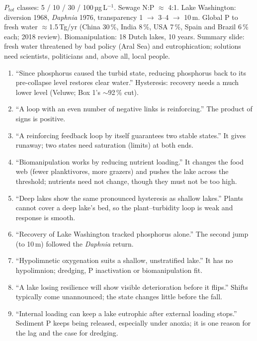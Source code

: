 \begin{numbers}
$P_{tot}$ classes: 5 / 10 / 30 / 100\,µg\,L$^{-1}$. Sewage N:P $\approx$ 4:1. Lake Washington: diversion 1968,
\emph{Daphnia} 1976, transparency 1 $\to$ 3--4 $\to$ 10\,m. Global P to fresh water $\approx$1.5\,Tg/yr (China 30\,\%,
India 8\,\%, USA 7\,\%, Spain and Brazil 6\,\% each; 2018 review). Biomanipulation: 18 Dutch lakes, 10 years.
Summary slide: fresh water threatened by bad policy (Aral Sea) and eutrophication; solutions need scientists,
politicians and, above all, local people.
\end{numbers}

\begin{statements}
\begin{enumerate}[label=\arabic*.]
\item ``Since phosphorus caused the turbid state, reducing phosphorus back to its pre-collapse level restores clear water.''
\F Hysteresis: recovery needs a much lower level (Veluwe; Box 1's $\sim$92\,\% cut).
\item ``A loop with an even number of negative links is reinforcing.''
\T The product of signs is positive.
\item ``A reinforcing feedback loop by itself guarantees two stable states.''
\F It gives runaway; two states need saturation (limits) at both ends.
\item ``Biomanipulation works by reducing nutrient loading.''
\F It changes the food web (fewer planktivores, more grazers) and pushes the lake across the threshold; nutrients
need not change, though they must not be too high.
\item ``Deep lakes show the same pronounced hysteresis as shallow lakes.''
\F Plants cannot cover a deep lake's bed, so the plant--turbidity loop is weak and response is smooth.
\item ``Recovery of Lake Washington tracked phosphorus alone.''
\F The second jump (to 10\,m) followed the \emph{Daphnia} return.
\item ``Hypolimnetic oxygenation suits a shallow, unstratified lake.''
\F It has no hypolimnion; dredging, P inactivation or biomanipulation fit.
\item ``A lake losing resilience will show visible deterioration before it flips.''
\F Shifts typically come unannounced; the state changes little before the fall.
\item ``Internal loading can keep a lake eutrophic after external loading stops.''
\T Sediment P keeps being released, especially under anoxia; it is one reason for the lag and the case for dredging.
\end{enumerate}
\end{statements}

